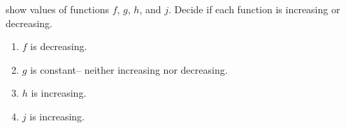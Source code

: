 \begin{exercises}
\begin{problem}\label{fun:prob:incdecnumerically}
 show values of functions $f$, 
$g$, $h$, and $j$. Decide if each function is increasing or decreasing.
\begin{shortsolution}
	\begin{enumerate}
		\item $f$ is decreasing.
		\item $g$ is constant-- neither increasing nor decreasing.
		\item $h$ is increasing.
		\item $j$ is increasing.
	\end{enumerate}
\end{shortsolution}


\end{problem}
\end{exercises}
